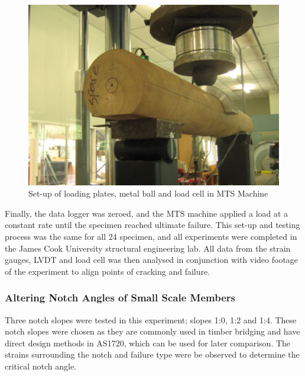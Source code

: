 \documentclass[11pt,a4paper]{article}
\numberwithin{equation}{subsection}
\begin{document}
\vspace*{\baselineskip}

\begin{figure}[h]
	\begin{center}
		\includegraphics[scale=0.35]{SETUP}
	\end{center}
	\caption{Set-up of loading plates, metal ball and load cell in MTS Machine}
	\label{fig:SETUP}
\end{figure}

\noindent
Finally, the data logger was zeroed, and the MTS machine applied a load at a constant rate until the specimen reached ultimate failure. This set-up and testing process was the same for all 24 specimen, and all experiments were completed in the James Cook University structural engineering lab. All data from the strain gauges, LVDT and load cell was then analysed in conjunction with video footage of the experiment to align points of cracking and failure.

\subsubsection{Altering Notch Angles of Small Scale Members}
Three notch slopes were tested in this experiment; slopes 1:0, 1:2 and 1:4. These notch slopes were chosen as they are commonly used in timber bridging and have direct design methods in AS1720, which can be used for later comparison. The strains surrounding the notch and failure type were be observed to determine the critical notch angle. 
\end{document}
